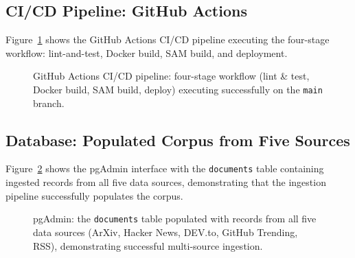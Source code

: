 \documentclass[12pt,a4paper]{report}
\begin{document}
\subsection{CI/CD Pipeline: GitHub Actions}

Figure~\ref{fig:demo_cicd} shows the GitHub Actions CI/CD pipeline executing the four-stage workflow: lint-and-test, Docker build, SAM build, and deployment.

\begin{figure}[H]
\centering
{}
\caption{GitHub Actions CI/CD pipeline: four-stage workflow (lint \& test, Docker build, SAM build, deploy) executing successfully on the \texttt{main} branch.}
\label{fig:demo_cicd}
\end{figure}

\subsection{Database: Populated Corpus from Five Sources}

Figure~\ref{fig:demo_pgadmin} shows the pgAdmin interface with the \texttt{documents} table containing ingested records from all five data sources, demonstrating that the ingestion pipeline successfully populates the corpus.

\begin{figure}[H]
\centering
{}
\caption{pgAdmin: the \texttt{documents} table populated with records from all five data sources (ArXiv, Hacker News, DEV.to, GitHub Trending, RSS), demonstrating successful multi-source ingestion.}
\label{fig:demo_pgadmin}
\end{figure}

\end{document}
